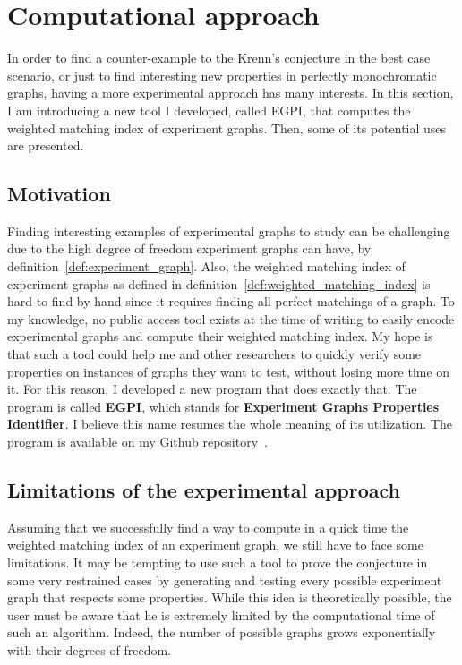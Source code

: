 \chapter{Computational approach}
\label{ch:computational-approach}

In order to find a counter-example to the Krenn's conjecture in the best case scenario, or just to find interesting new properties in perfectly monochromatic graphs, having a more experimental approach has many interests.
In this section, I am introducing a new tool I developed, called EGPI, that computes the weighted matching index of experiment graphs.
Then, some of its potential uses are presented.

\section{Motivation}
\label{sec:computational-motivations}

Finding interesting examples of experimental graphs to study can be challenging due to the high degree of freedom experiment graphs can have, by definition~\ref{def:experiment_graph}.
Also, the weighted matching index of experiment graphs as defined in definition~\ref{def:weighted_matching_index} is hard to find by hand since it requires finding all perfect matchings of a graph.
To my knowledge, no public access tool exists at the time of writing to easily encode experimental graphs and compute their weighted matching index.
My hope is that such a tool could help me and other researchers to quickly verify some properties on instances of graphs they want to test, without losing more time on it.
For this reason, I developed a new program that does exactly that.
The program is called \textbf{EGPI}, which stands for \textbf{Experiment Graphs Properties Identifier}.
I believe this name resumes the whole meaning of its utilization.
The program is available on my Github repository~\cite{githubEGPI}.


\section{Limitations of the experimental approach}
\label{sec:egpi-limitations}

Assuming that we successfully find a way to compute in a quick time the weighted matching index of an experiment graph, we still have to face some limitations.
It may be tempting to use such a tool to prove the conjecture in some very restrained cases by generating and testing every possible experiment graph that respects some properties.
While this idea is theoretically possible, the user must be aware that he is extremely limited by the computational time of such an algorithm.
Indeed, the number of possible graphs grows exponentially with their degrees of freedom.\\

